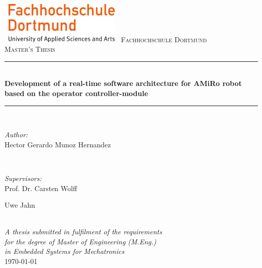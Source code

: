 \documentclass[12pt]{report}%
\begin{document}
\begin{titlepage}

\newcommand{\HRule}{\rule{\linewidth}{0.5mm}}

\includegraphics[width=6cm, height=2cm]{fhlogo}
\vfill
\center %
\textsc{\LARGE Fachhochschule Dortmund}\\[1.5cm] %
\textsc{\Large Master's Thesis}\\[0.5cm] %

\HRule \\[0.4cm]
{\large \bfseries Development of a real-time software architecture for AMiRo robot based on the operator controller-module}\\[0.4cm]
\HRule \\[1.5cm]

\begin{minipage}{0.4\textwidth}
\begin{flushleft} \large
\emph{Author:}\\
Hector Gerardo Munoz Hernandez
\end{flushleft}
\end{minipage}
~
\begin{minipage}{0.4\textwidth}
\begin{flushright} \large
\emph{Supervisors:} \\
Prof. Dr. Carsten Wolff

Uwe Jahn
\end{flushright}
\end{minipage}\\[2cm]

\large \textit{A thesis submitted in fulfilment of the requirements\\ for the degree of Master of Engineering (M.Eng.)\\ in Embedded Systems for Mechatronics}\\[0.3cm]

{\large \today}\\[1cm]

\vfill
\end{titlepage}

\tableofcontents
\listoffigures
\listoftables
\end{document}
